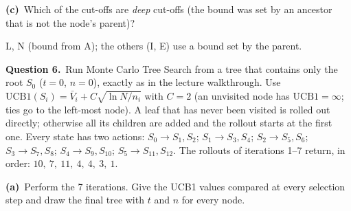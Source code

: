 \documentclass[11pt,a4paper]{article}
\newcommand{\question}[1]{\par\medskip\noindent\textbf{Question #1.}\ }
\newcommand{\subq}[1]{\par\smallskip\noindent\textbf{#1}\ }
\begin{document}
\subq{(c)}Which of the cut-offs are \emph{deep} cut-offs (the bound was set by an ancestor that is not the node's parent)?
\begin{solbox}
L, N (bound from A); the others (I, E) use a bound set by the parent.
\end{solbox}
\question{6}Run Monte Carlo Tree Search from a tree that contains only the root $S_0$ ($t=0$, $n=0$), exactly as in the lecture walkthrough. Use $\mathrm{UCB1}(S_i)=\bar V_i + C\sqrt{\ln N/n_i}$ with $C=2$ (an unvisited node has $\mathrm{UCB1}=\infty$; ties go to the left-most node). A leaf that has never been visited is rolled out directly; otherwise all its children are added and the rollout starts at the first one. Every state has two actions: $S_0\to S_1,S_2$; $S_1\to S_3,S_4$; $S_2\to S_5,S_6$; $S_3\to S_7,S_8$; $S_4\to S_9,S_{10}$; $S_5\to S_{11},S_{12}$. The rollouts of iterations 1--7 return, in order: $10,\ 7,\ 11,\ 4,\ 4,\ 3,\ 1$.
\subq{(a)}Perform the 7 iterations. Give the UCB1 values compared at every selection step and draw the final tree with $t$ and $n$ for every node.
\end{document}
